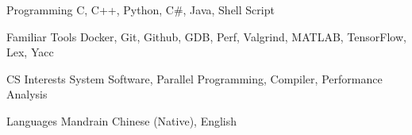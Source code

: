 

\begin{cvskills}

  \cvskill
    {Programming} %
    {C, C++, Python, C\#, Java, Shell Script} %

  \cvskill
    {Familiar Tools} %
    {Docker, Git, Github, GDB, Perf, Valgrind, MATLAB, TensorFlow, Lex, Yacc} %

  \cvskill
    {CS Interests} %
    {System Software, Parallel Programming, Compiler, Performance Analysis} %

  \cvskill
    {Languages} %
    {Mandrain Chinese (Native), English} %

\end{cvskills}
